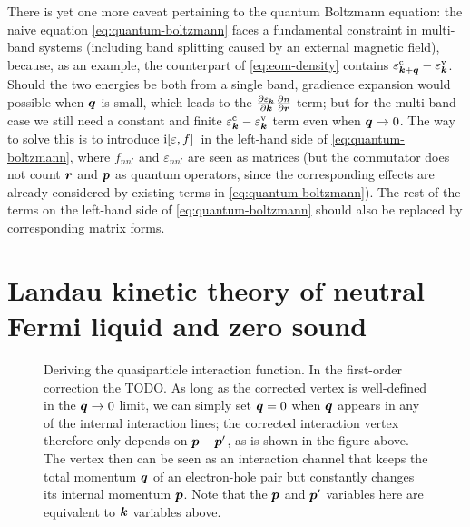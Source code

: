 \documentclass[hyperref, a4paper]{article}
\newcommand*{\ii}{\mathrm{i}}
\begin{document}
There is yet one more caveat pertaining to the quantum Boltzmann equation:
the naive equation \eqref{eq:quantum-boltzmann} faces a fundamental constraint in multi-band systems
(including band splitting caused by an external magnetic field),
because, as an example, the counterpart of \eqref{eq:eom-density}
contains $\varepsilon^{\text{c}}_{\vb*{k} + \vb*{q}} - \varepsilon^{\text{v}}_{\vb*{k}}$.
Should the two energies be both from a single band, 
gradience expansion would possible when $\vb*{q}$ is small, 
which leads to the $\pdv{\varepsilon_{\vb*{k}}}{\vb*{k}} \pdv{n}{\vb*{r}}$ term;
but for the multi-band case we still need a constant and finite 
$\varepsilon^{\text{c}}_{\vb*{k}} - \varepsilon^{\text{v}}_{\vb*{k}}$ term
even when $\vb*{q} \to 0$.
The way to solve this is to introduce $\ii \comm*{\varepsilon}{f}$ 
in the left-hand side of \eqref{eq:quantum-boltzmann},
where $f_{n n'}$ and $\varepsilon_{n n'}$
are seen as matrices (but the commutator does not count $\vb*{r}$ and $\vb*{p}$ as 
quantum operators, since the corresponding effects are already considered 
by existing terms in \eqref{eq:quantum-boltzmann}).
The rest of the terms on the left-hand side of \eqref{eq:quantum-boltzmann}
should also be replaced by corresponding matrix forms.

\section{Landau kinetic theory of neutral Fermi liquid and zero sound} 

\begin{figure}
    \centering
    
    \caption{Deriving the quasiparticle interaction function.
    In the first-order correction the TODO.
    As long as the corrected vertex is well-defined in the $\vb*{q} \to 0$ limit, 
    we can simply set $\vb*{q} = 0$ when $\vb*{q}$ appears 
    in any of the internal interaction lines;
    the corrected interaction vertex therefore only depends on $\vb*{p} - \vb*{p}'$,
    as is shown in the figure above.
    The vertex then can be seen as an interaction channel 
    that keeps the total momentum $\vb*{q}$ of an electron-hole pair 
    but constantly changes its internal momentum $\vb*{p}$.
    Note that the $\vb*{p}$ and $\vb*{p}'$ variables here 
    are equivalent to $\vb*{k}$ variables above.}
    \label{fig:bse-diagram}
\end{figure}
\end{document}
